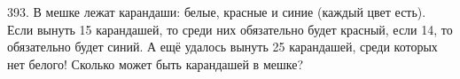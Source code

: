 393. В мешке лежат карандаши: белые, красные и синие (каждый цвет есть). Если вынуть 15 карандашей, то среди них обязательно будет красный, если 14, то обязательно будет синий. А ещё удалось вынуть 25 карандашей, среди которых нет белого! Сколько может быть карандашей в мешке?\\
